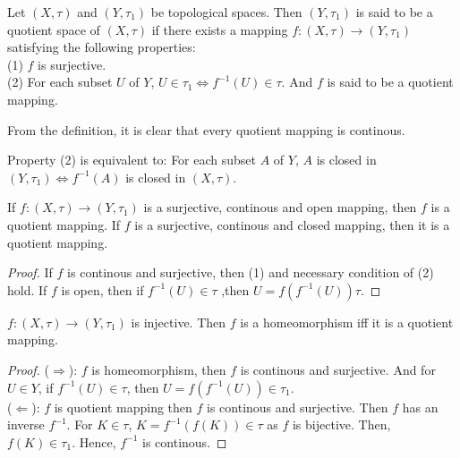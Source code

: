 \begin{definition}{}{}
    Let $(X,\tau)$ and $(Y,\tau_1)$ be topological spaces.
    Then $(Y,\tau_1)$ is said to be a quotient space of $(X,\tau)$ if there exists a mapping $f:(X,\tau)\rightarrow (Y,\tau_1)$ satisfying the following properties: \\
    (1) $f$ is surjective.\\
    (2) For each subset $U$ of $Y$, $U\in \tau_1\Leftrightarrow f^{-1}(U)\in \tau$.
    And $f$ is said to be a quotient mapping.
\end{definition}

\begin{remark}
    From the definition, it is clear that every quotient mapping is continous.
\end{remark}

\begin{remark}
    Property (2) is equivalent to: For each subset $A$ of $Y$, 
    $A$ is closed in $(Y,\tau_1)\Leftrightarrow f^{-1}(A)$ is closed in $(X,\tau)$.
\end{remark}

\begin{proposition}{}{}
    If $f:(X,\tau)\rightarrow (Y,\tau_1)$ is a surjective, continous and open mapping, then $f$ is a quotient mapping.
    If $f$ is a surjective, continous and closed mapping, then it is a quotient mapping.
\end{proposition}
\begin{proof}
    If $f$ is continous and surjective, then (1) and necessary condition of (2) hold.
    If $f$ is open, then if $f^{-1}(U)\in \tau$ ,then $U=f(f^{-1}(U))\tau$. 
\end{proof}

\begin{proposition}{}{}
    $f:(X,\tau)\rightarrow (Y,\tau_1)$ is injective. Then $f$ is a homeomorphism iff it is a quotient mapping.
\end{proposition}
\begin{proof}
    ($\Rightarrow$): $f$ is homeomorphism, then $f$ is continous and surjective.
    And for $U\in Y$, if $f^{-1}(U)\in \tau$, then $U=f(f^{-1}(U))\in \tau_1$.
    \\
    ($\Leftarrow$): $f$ is quotient mapping then $f$ is continous and surjective. Then $f$ has an inverse $f^{-1}$.
    For $K\in \tau$, $K=f^{-1}(f(K))\in\tau$ as $f$ is bijective. Then, $f(K)\in \tau_1$. Hence, $f^{-1}$ is continous.
\end{proof}

